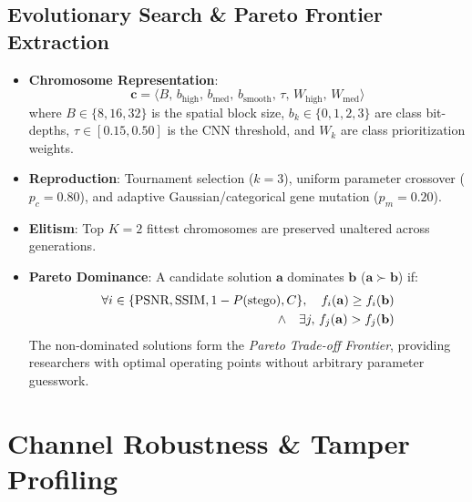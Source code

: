 \documentclass[conference]{IEEEtran}
\begin{document}
\subsection{Evolutionary Search \& Pareto Frontier Extraction}
\begin{itemize}
    \item \textbf{Chromosome Representation}:
    \begin{equation}
        \mathbf{c} = \langle B, \, b_{\text{high}}, \, b_{\text{med}}, \, b_{\text{smooth}}, \, \tau, \, W_{\text{high}}, \, W_{\text{med}} \rangle
    \end{equation}
    where $B \in \{8, 16, 32\}$ is the spatial block size, $b_k \in \{0, 1, 2, 3\}$ are class bit-depths, $\tau \in [0.15, 0.50]$ is the CNN threshold, and $W_k$ are class prioritization weights.
    \item \textbf{Reproduction}: Tournament selection ($k=3$), uniform parameter crossover ($p_c = 0.80$), and adaptive Gaussian/categorical gene mutation ($p_m = 0.20$).
    \item \textbf{Elitism}: Top $K=2$ fittest chromosomes are preserved unaltered across generations.
    \item \textbf{Pareto Dominance}: A candidate solution $\mathbf{a}$ dominates $\mathbf{b}$ ($\mathbf{a} \succ \mathbf{b}$) if:
    \begin{align}
        \forall i \in \{\text{PSNR}, \text{SSIM}, 1 - P(\text{stego}), C\}, \quad f_i(\mathbf{a}) \ge f_i(\mathbf{b}) \notag \\
        \wedge \quad \exists j, \, f_j(\mathbf{a}) > f_j(\mathbf{b})
    \end{align}
    The non-dominated solutions form the \textit{Pareto Trade-off Frontier}, providing researchers with optimal operating points without arbitrary parameter guesswork.
\end{itemize}

\section{Channel Robustness \& Tamper Profiling}
\end{document}
